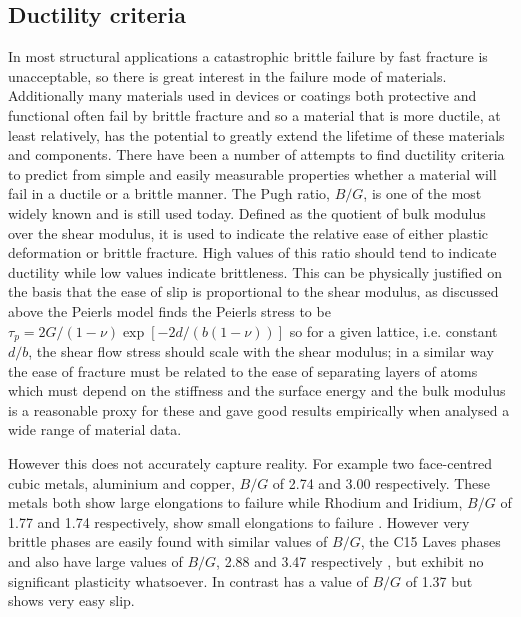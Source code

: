 \newpage

\subsection{Ductility criteria}
\label{subsec:ductility_criteria}
 In most structural applications a catastrophic brittle failure by fast fracture is unacceptable, so there is great interest in the failure mode of materials. Additionally many materials used in devices or coatings both protective and functional often fail by brittle fracture and so a material that is more ductile, at least relatively, has the potential to greatly extend the lifetime of these materials and components.
There have been a number of attempts to find ductility criteria to predict from simple and easily measurable properties whether a material will fail in a ductile or a brittle manner.
The Pugh ratio, $B/G$, is one of the most widely known and is still used today. Defined as the quotient of bulk modulus over the shear modulus, it is used to indicate the relative ease of either plastic deformation or brittle fracture. High values of this ratio should tend to indicate ductility while low values indicate brittleness. This can be physically justified on the basis that the ease of slip is proportional to the shear modulus, as discussed above the Peierls model finds the Peierls stress to be $\tau_p = 2G / (1-\nu) \exp[-2d/(b(1-\nu))]$ so for a given lattice, i.e. constant $d/b$, the shear flow stress should scale with the shear modulus; in a similar way the ease of fracture must be related to the ease of separating layers of atoms which must depend on the stiffness and the surface energy and the bulk modulus is a reasonable proxy for these and gave good results empirically when \citet{Pugh1954} analysed a wide range of material data.

However this does not accurately capture reality. For example two face-centred cubic metals, aluminium and copper, $B/G$ of 2.74 and 3.00 respectively. These metals both show large elongations to failure while Rhodium and Iridium, $B/G$ of 1.77 and 1.74 respectively, show small elongations to failure \cite{Pugh1954}. However very brittle phases are easily found with similar values of $B/G$, the C15 Laves phases \cite{Stein2004,Stein2005}  and  also have large values of $B/G$, 2.88 and 3.47 respectively \cite{Chu1995}, but exhibit no significant plasticity whatsoever. In contrast  has a value of $B/G$ of 1.37 \cite{Barsoum2011} but shows very easy slip.



